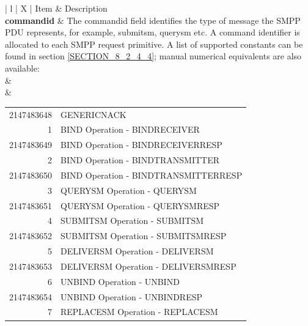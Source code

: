 \documentclass[a4paper,latin]{paper}
\begin{document}
\noindent\begin{tabularx}{\textwidth}{ | l | X |}
	\hline
	Item	 								& Description \\
	\hline
	\textbf{command\textunderscore{}id}					& The command\textunderscore{}id field identifies the type of message the SMPP PDU represents, for example, 
										  submit\textunderscore{}sm, query\textunderscore{}sm etc. A command identifier is allocated to 
										  each SMPP request primitive. A list of supported constants can be found in section \ref{SECTION_8_2_4_4}; manual 
										  numerical equivalents are also available: \\
										& \\
										& {
										  \begin{tabularx}{12cm}{  r l }
										    2147483648		&	GENERIC\textunderscore{}NACK \\
										    1			&	BIND Operation - BIND\textunderscore{}RECEIVER \\
										    2147483649      	&       BIND Operation - BIND\textunderscore{}RECEIVER\textunderscore{}RESP \\
										    2  			&	BIND Operation - BIND\textunderscore{}TRANSMITTER \\
										    2147483650  	&	BIND Operation - BIND\textunderscore{}TRANSMITTER\textunderscore{}RESP \\
										    3            	&	QUERY\textunderscore{}SM Operation - QUERY\textunderscore{}SM \\
										    2147483651   	&	QUERY\textunderscore{}SM Operation - QUERY\textunderscore{}SM\textunderscore{}RESP \\
										    4 			&	SUBMIT\textunderscore{}SM Operation - SUBMIT\textunderscore{}SM \\
										    2147483652     	&	SUBMIT\textunderscore{}SM Operation - SUBMIT\textunderscore{}SM\textunderscore{}RESP \\
										    5           	&	DELIVER\textunderscore{}SM Operation - DELIVER\textunderscore{}SM \\
										    2147483653   	&	DELIVER\textunderscore{}SM Operation - DELIVER\textunderscore{}SM\textunderscore{}RESP \\
										    6        		&	UNBIND Operation - UNBIND \\
										    2147483654 		&	UNBIND Operation - UNBIND\textunderscore{}RESP \\
										    7               	&	REPLACE\textunderscore{}SM Operation - REPLACE\textunderscore{}SM \\

\end{tabularx}}
\end{tabularx}
\end{document}
